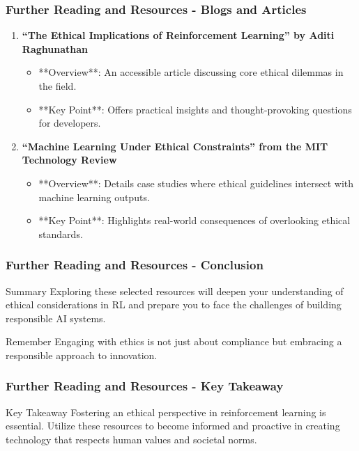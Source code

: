\documentclass[aspectratio=169]{beamer}
\begin{document}
\begin{frame}[fragile]
  \frametitle{Further Reading and Resources - Blogs and Articles}
  \begin{enumerate}
    \item \textbf{“The Ethical Implications of Reinforcement Learning” by Aditi Raghunathan}
      \begin{itemize}
        \item **Overview**: An accessible article discussing core ethical dilemmas in the field.
        \item **Key Point**: Offers practical insights and thought-provoking questions for developers.
      \end{itemize}

    \item \textbf{“Machine Learning Under Ethical Constraints” from the MIT Technology Review}
      \begin{itemize}
        \item **Overview**: Details case studies where ethical guidelines intersect with machine learning outputs.
        \item **Key Point**: Highlights real-world consequences of overlooking ethical standards.
      \end{itemize}
  \end{enumerate}
\end{frame}

\begin{frame}[fragile]
  \frametitle{Further Reading and Resources - Conclusion}
  \begin{block}{Summary}
    Exploring these selected resources will deepen your understanding of ethical considerations in RL and prepare you to face the challenges of building responsible AI systems.
  \end{block}
  \begin{alertblock}{Remember}
    Engaging with ethics is not just about compliance but embracing a responsible approach to innovation.
  \end{alertblock}
\end{frame}

\begin{frame}[fragile]
  \frametitle{Further Reading and Resources - Key Takeaway}
  \begin{block}{Key Takeaway}
    Fostering an ethical perspective in reinforcement learning is essential. Utilize these resources to become informed and proactive in creating technology that respects human values and societal norms.
  \end{block}
\end{frame}
\end{document}
